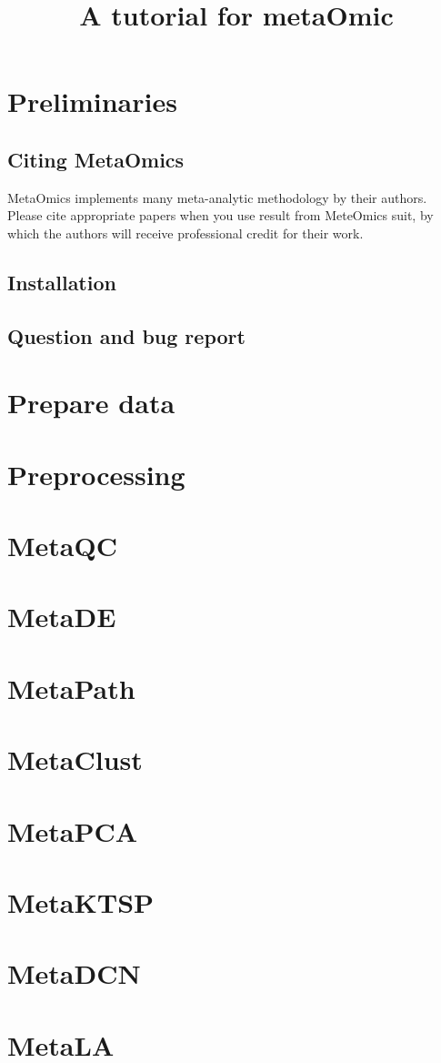 \documentclass{article}
\title{A tutorial for metaOmic}
\author{}
\date{ }
\begin{document}
 
\maketitle
 
\tableofcontents
 
 
 
\section{Preliminaries}
\subsection{Citing MetaOmics}
MetaOmics implements many meta-analytic methodology by their authors. 
Please cite appropriate papers when you use result from MeteOmics suit,
by which the authors will receive professional credit for their work.

\subsection{Installation}
\subsection{Question and bug report}
 
\section{Prepare data}
 
\section{Preprocessing}

\section{MetaQC}

\section{MetaDE}

\section{MetaPath}

\section{MetaClust}

\section{MetaPCA}

\section{MetaKTSP}

\section{MetaDCN}

\section{MetaLA}
 
\end{document}
